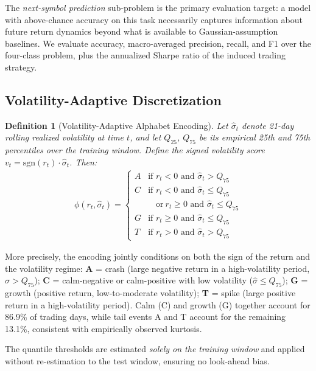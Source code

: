 \documentclass[11pt]{article}
\newtheorem{definition}{Definition}
\begin{document}
The \emph{next-symbol prediction} sub-problem is the primary evaluation
target: a model with above-chance accuracy on this task necessarily
captures information about future return dynamics beyond what is
available to Gaussian-assumption baselines.  We evaluate accuracy,
macro-averaged precision, recall, and F1 over the four-class
problem, plus the annualized Sharpe ratio of the induced trading
strategy.

\subsection{Volatility-Adaptive Discretization}

\begin{definition}[Volatility-Adaptive Alphabet Encoding]
Let $\hat{\sigma}_t$ denote 21-day rolling realized volatility at time
$t$, and let $Q_{25}$, $Q_{75}$ be its empirical 25th and 75th
percentiles over the training window.  Define the signed volatility
score $v_t = \text{sgn}(r_t) \cdot \hat{\sigma}_t$.  Then:
\begin{align}
\phi(r_t, \hat{\sigma}_t) = \begin{cases}
A & \text{if } r_t < 0 \text{ and } \hat{\sigma}_t > Q_{75} \\
C & \text{if } r_t < 0 \text{ and } \hat{\sigma}_t \leq Q_{75} \\
  & \phantom{\text{if }} \text{or}\ r_t \geq 0 \text{ and } \hat{\sigma}_t \leq Q_{75} \\
G & \text{if } r_t \geq 0 \text{ and } \hat{\sigma}_t \leq Q_{75} \\
T & \text{if } r_t > 0 \text{ and } \hat{\sigma}_t > Q_{75}
\end{cases}
\label{eq:encoding}
\end{align}
\end{definition}

More precisely, the encoding jointly conditions on both the sign of the
return and the volatility regime: \textbf{A} = crash (large negative
return in a high-volatility period, $\hat\sigma > Q_{75}$);
\textbf{C} = calm-negative or calm-positive with low volatility
($\hat\sigma \leq Q_{75}$); \textbf{G} = growth (positive return,
low-to-moderate volatility); \textbf{T} = spike (large positive return
in a high-volatility period).  Calm (C) and growth (G) together account
for 86.9\% of trading days, while tail events A and T account for the
remaining 13.1\%, consistent with empirically observed kurtosis.

The quantile thresholds are estimated \emph{solely on the training
window} and applied without re-estimation to the test window, ensuring
no look-ahead bias.
\end{document}
